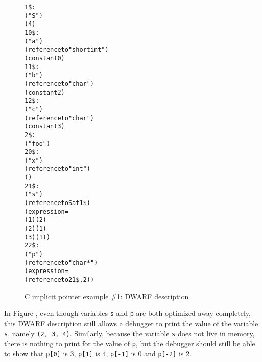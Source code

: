 \begin{figure}[ht]
\begin{dwflisting}
\begin{alltt}
1\$:   \DWTAGstructuretype
          \DWATname("S")
          \DWATbytesize(4)
10\$:      \DWTAGmember
              \DWATname("a")
              \DWATtype(reference to "short int")
              \DWATdatamemberlocation(constant 0)
11\$:      \DWTAGmember
              \DWATname("b")
              \DWATtype(reference to "char")
              \DWATdatamemberlocation(constant 2)
12\$:      \DWTAGmember
              \DWATname("c")
              \DWATtype(reference to "char")
              \DWATdatamemberlocation(constant 3)
2\$:   \DWTAGsubprogram
          \DWATname("foo")
20\$:      \DWTAGformalparameter
              \DWATname("x")
              \DWATtype(reference to "int")
              \DWATlocation(\DWOPregfive)
21\$:      \DWTAGvariable
              \DWATname("s")
              \DWATtype(reference to S at 1\$)
              \DWATlocation(expression=
                  \DWOPbregfive(1) \DWOPstackvalue \DWOPpiece(2)
                  \DWOPbregfive(2) \DWOPstackvalue \DWOPpiece(1)
                  \DWOPbregfive(3) \DWOPstackvalue \DWOPpiece(1))
22\$:      \DWTAGvariable
              \DWATname("p")
              \DWATtype(reference to "char *")
              \DWATlocation(expression=
                  \DWOPimplicitpointer(reference to 21\$, 2))
\end{alltt}
\end{dwflisting}
\caption{C implicit pointer example \#1: DWARF description}
\label{fig:cimplicitpointerexample1dwarf}
\end{figure}

In Figure ,
even though variables \texttt{s} and \texttt{p} are both optimized 
away completely, this DWARF description still allows a debugger to 
print the value of the variable \texttt{s}, namely \texttt{(2, 3, 4)}. 
Similarly, because the variable \texttt{s} does not live in
memory, there is nothing to print for the value of \texttt{p}, but the 
debugger should still be able to show that \texttt{p[0]} is 3, 
\texttt{p[1]} is 4, \texttt{p[-1]} is 0 and \texttt{p[-2]} is 2.


